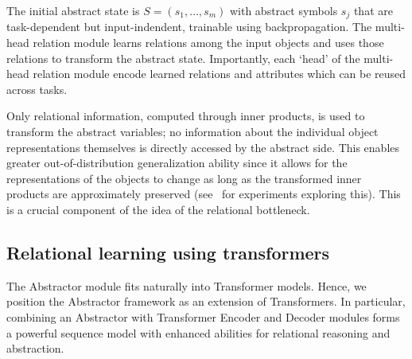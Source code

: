 
The initial abstract state is $S = (s_1,\ldots, s_m)$
with abstract symbols $s_j$ that are task-dependent but input-indendent, trainable using
backpropagation. The multi-head relation module learns relations among the input objects and uses those
relations to transform the abstract state. Importantly, each `head' of the multi-head relation module
encode learned relations and attributes which can be reused across tasks.

Only relational information, computed through inner products,
is used to transform the abstract variables; no information about the individual object representations themselves is directly accessed by the abstract side. This enables greater out-of-distribution generalization ability since it allows for the representations of the objects to change as long as the transformed inner products are approximately preserved (see~ for experiments exploring this). This is a crucial component of the idea of the relational bottleneck.



\subsection{Relational learning using transformers}

The Abstractor module fits naturally into Transformer models. Hence, we position the Abstractor framework as an extension of Transformers. In particular, combining an Abstractor with Transformer Encoder and Decoder modules forms a powerful sequence model with enhanced abilities for relational reasoning and abstraction.

